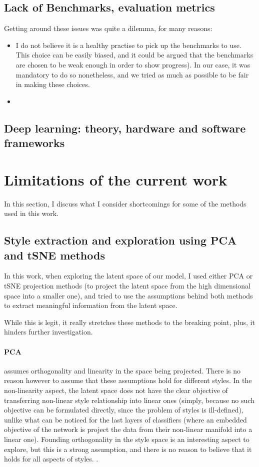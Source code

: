 \subsection{Lack of Benchmarks, evaluation metrics}
Getting around these issues was quite a dilemma, for many reasons:
\begin{itemize}[noitemsep]
    \item I do not believe it is a healthy practise to pick up the benchmarks to use. This choice can be easily biased, and it could be argued that the benchmarks are chosen to be weak enough in order to show progress). In our case, it was mandatory to do so nonetheless, and we tried as much as possible to be fair in making these choices.
    \item
\end{itemize}

\subsection{Deep learning: theory, hardware and software frameworks}
\par

\section{Limitations of the current work}
In this section, I discuss what I consider shortcomings for some of the methods used in this work.

\subsection{Style extraction and exploration using PCA and tSNE methods}
In this work, when exploring the latent space of our model, I used either PCA or tSNE projection methods (to project the latent space from the high dimensional space into a smaller one), and tried to use the assumptions behind both methods to extract meaningful information from the latent space.

While this is legit, it really stretches these methods to the breaking point, plus, it hinders further investigation.

\paragraph{PCA} assumes orthogonality and linearity in the space being projected. There is no reason however to assume that these assumptions hold for different styles.
In the non-linearity aspect, the latent space does not have the clear objective of transferring non-linear style relationship into linear ones (simply, because no such objective can be formulated directly, since the problem of styles is ill-defined), unlike what can be noticed for the last layers of classifiers (where an embedded objective of the network is project the data from their non-linear manifold into a linear one).
Founding orthogonality in the style space is an interesting aspect to explore, but this is a strong assumption, and there is no reason to believe that it holds for all aspects of styles.
.
